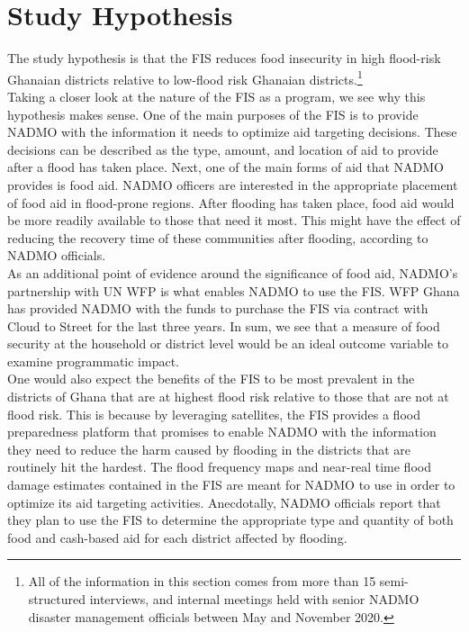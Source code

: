 \chapter{Study Hypothesis}

The study hypothesis is that the FIS reduces food insecurity in high flood-risk Ghanaian districts relative to low-flood risk Ghanaian districts.\footnote{All of the information in this section comes from more than 15 semi-structured interviews, and internal meetings held with senior NADMO disaster management officials between May and November 2020.}\\

Taking a closer look at the nature of the FIS as a program, we see why this hypothesis makes sense. One of the main purposes of the FIS is to provide NADMO with the information it needs to optimize aid targeting decisions. These decisions can be described as the type, amount, and location of aid to provide after a flood has taken place. Next, one of the main forms of aid that NADMO provides is food aid. NADMO officers are interested in the appropriate placement of food aid in flood-prone regions. After flooding has taken place, food aid would be more readily available to those that need it most. This might have the effect of reducing the recovery time of these communities after flooding, according to NADMO officials.\\

As an additional point of evidence around the significance of food aid, NADMO’s partnership with UN WFP is what enables NADMO to use the FIS. WFP Ghana has provided NADMO with the funds to purchase the FIS via contract with Cloud to Street for the last three years. In sum, we see that a measure of food security at the household or district level would be an ideal outcome variable to examine programmatic impact.\\

One would also expect the benefits of the FIS to be most prevalent in the districts of Ghana that are at highest flood risk relative to those that are not at flood risk. This is because by leveraging satellites, the FIS provides a flood preparedness platform that promises to enable NADMO with the information they need to reduce the harm caused by flooding in the districts that are routinely hit the hardest. The flood frequency maps and near-real time flood damage estimates contained in the FIS are meant for NADMO to use in order to optimize its aid targeting activities. Anecdotally, NADMO officials report that they plan to use the FIS to determine the appropriate type and quantity of both food and cash-based aid for each district affected by flooding.

